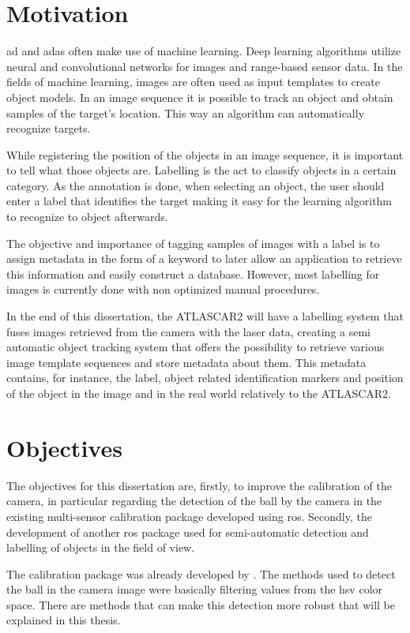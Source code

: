 \section{Motivation}

\gls{ad} and \gls{adas} often make use of machine learning. Deep learning algorithms utilize neural and convolutional networks for images and range-based sensor data. In the fields of machine learning, images are often used as input templates to create object models. In an image sequence it is possible to track an object and obtain samples of the target's location. This way an algorithm can automatically recognize targets.

While registering the position of the objects in an image sequence, it is important to tell what those objects are. Labelling is the act to classify objects in a certain category. As the annotation is done, when selecting an object, the user should enter a label that identifies the target making it easy for the learning algorithm to recognize to object afterwards.

The objective and importance of tagging samples of images with a label is to assign metadata in the form of a keyword to later allow an application to retrieve this information and easily construct a database. However, most labelling for images is currently done with non optimized manual procedures.

In the end of this dissertation, the ATLASCAR2 will have a labelling system that fuses images retrieved from the camera with the laser data, creating a semi automatic object tracking system that offers the possibility to retrieve various image template sequences and store metadata about them. This metadata contains, for instance, the label, object related identification markers and position of the object in the image and in the real world relatively to the ATLASCAR2.

\section{Objectives}
The objectives for this dissertation are, firstly, to improve the calibration of the camera, in particular regarding the detection of the ball by the camera in the existing multi-sensor calibration package developed using \gls{ros}. Secondly, the development of another \gls{ros} package used for semi-automatic detection and labelling of objects in the field of view.

The calibration package was already developed by \cite{VieiradaSilva2016}. The methods used to detect the ball in the camera image were basically filtering values from the \gls{hsv} color space. There are methods that can make this detection more robust that will be explained in this thesis. 

